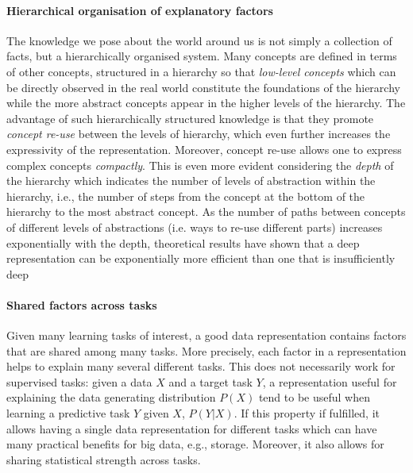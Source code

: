 \paragraph{\textbf{Hierarchical organisation of explanatory factors}}
The knowledge we pose about the world around us is not simply a collection of facts, but a hierarchically organised system.
Many concepts are defined in terms of other concepts, structured in a hierarchy so that \textit{low-level concepts} which can be directly observed in the real world constitute the foundations of the hierarchy while the more abstract concepts appear in the higher levels of the hierarchy.
The advantage of such hierarchically structured knowledge is that they promote \textit{concept re-use} between the levels of hierarchy, which even further increases the expressivity of the representation.
Moreover, concept re-use allows one to express complex concepts \textit{compactly}.
This is even more evident considering the \textit{depth} of the hierarchy which indicates the number of levels of abstraction within the hierarchy, i.e., the number of steps from the concept at the bottom of the hierarchy to the most abstract concept.
As the number of paths between concepts of different levels of abstractions (i.e. ways to re-use different parts) increases exponentially with the depth, theoretical results have shown that a deep representation can be exponentially more efficient than one that is insufficiently deep \cite{Hastad:1986:AOL:12130.12132,89582,Bengio:2011:EPD:2050345.2050349}





\paragraph{\textbf{Shared factors across tasks}}
Given many learning tasks of interest, a good data representation contains factors that are shared among many tasks.
More precisely, each factor in a representation helps to explain many several different tasks.
This does not necessarily work for supervised tasks: given a data $X$ and a target task $Y$, a representation useful for explaining the data generating distribution $P(X)$ tend to be useful when learning a predictive task $Y$ given $X$, $P(Y|X)$.
If this property if fulfilled, it allows having a single data representation for different tasks which can have many practical benefits for big data, e.g., storage.
Moreover, it also allows for sharing statistical strength across tasks.





